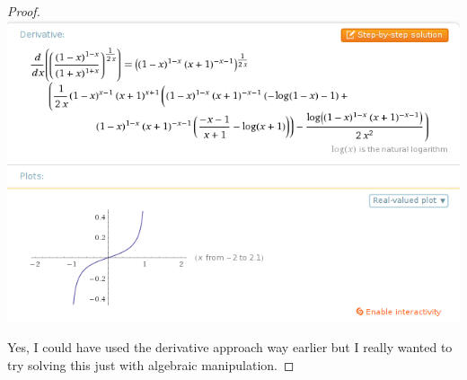 \documentclass[10pt,a4paper]{article}
\begin{document}
\begin{proof}
  \includegraphics[width=\textwidth]{sheet-9/exercise-9-4}

  Yes, I could have used the derivative approach way earlier but I really wanted to try solving this just with algebraic manipulation.
\end{proof}
\end{document}
